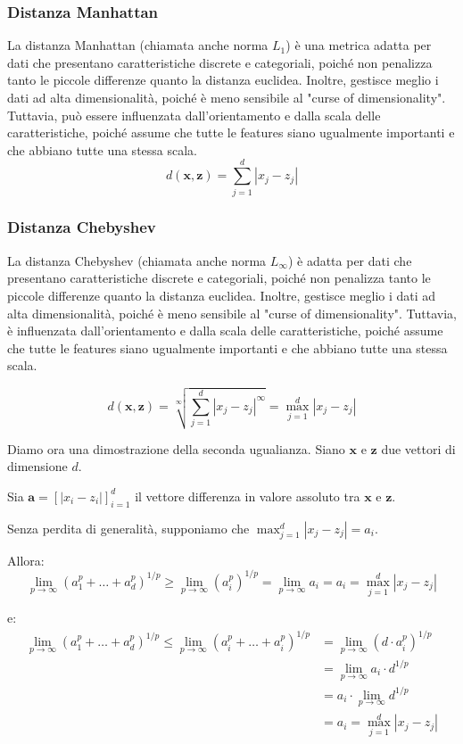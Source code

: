 \subsubsection{Distanza Manhattan} La distanza Manhattan (chiamata anche norma $L_1$) 
    è una metrica adatta per dati che presentano caratteristiche discrete e 
    categoriali, poiché non penalizza tanto le piccole differenze 
    quanto la distanza euclidea. Inoltre, gestisce meglio i dati ad alta 
    dimensionalità, poiché è meno sensibile al "curse of dimensionality". 
    Tuttavia, può essere influenzata dall'orientamento e dalla scala delle 
    caratteristiche, poiché assume che tutte le features siano ugualmente 
    importanti e che abbiano tutte una stessa scala.
    \[
    d(\mathbf{x}, \mathbf{z}) = \sum_{j=1}^d |x_j - z_j|
    \]

\subsubsection{Distanza Chebyshev} La distanza Chebyshev (chiamata anche norma $L_{\infty}$) 
    è adatta per dati che presentano caratteristiche discrete e 
    categoriali, poiché non penalizza tanto le piccole differenze 
    quanto la distanza euclidea. Inoltre, gestisce meglio i dati ad alta 
    dimensionalità, poiché è meno sensibile al "curse of dimensionality". 
    Tuttavia, è influenzata dall'orientamento e dalla scala delle 
    caratteristiche, poiché assume che tutte le features siano ugualmente 
    importanti e che abbiano tutte una stessa scala.

    \[
    d(\mathbf{x}, \mathbf{z}) = \sqrt[\infty]{\sum_{j=1}^d |x_j - z_j|^{\infty}} = \max_{j=1}^d |x_j - z_j|
    \]

    Diamo ora una dimostrazione della seconda ugualianza. Siano $\mathbf x$ e $\mathbf z$ due vettori di dimensione $d$.
    
    Sia $\mathbf a = [|x_i - z_i|]^{d}_{i=1}$ il vettore differenza in valore assoluto tra $\mathbf x$ e $\mathbf z$.
    
    Senza perdita di generalità, supponiamo che $\max_{j=1}^d |x_j - z_j| = a_i$.
    
    Allora:
    \[
    \lim_{p \to \infty} (a^p_1 + \ldots + a^p_d)^{1/p} \geq \lim_{p \to \infty} (a^p_i)^{1/p} = \lim_{p \to \infty} a_i = a_i = \max_{j=1}^d |x_j - z_j|
    \]
    
    e:
    \begin{align*}
    \lim_{p \to \infty} (a^p_1 + \ldots + a^p_d)^{1/p} \leq \lim_{p \to \infty} (a^p_i + \ldots + a^p_i)^{1/p} &= \lim_{p \to \infty} (d \cdot a^p_i)^{1/p} \\
    &= \lim_{p \to \infty} a_i \cdot d^{1/p} \\
    &= a_i \cdot \lim_{p \to \infty} d^{1/p} \\
    &= a_i = \max_{j=1}^d |x_j - z_j|
    \end{align*}

